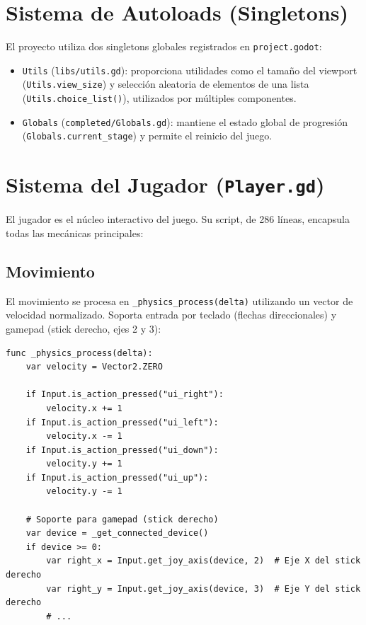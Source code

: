 \documentclass[12pt, a4paper, oneside]{report}
\begin{document}
\section{Sistema de Autoloads (Singletons)}

El proyecto utiliza dos singletons globales registrados en \texttt{project.godot}:

\begin{itemize}
    \item \texttt{Utils} (\texttt{libs/utils.gd}): proporciona utilidades como el tamaño del viewport (\texttt{Utils.view\-\_size}) y selección aleatoria de elementos de una lista (\texttt{Utils.choice\-\_list()}), utilizados por múltiples componentes.
    \item \texttt{Globals} (\texttt{completed/Globals.gd}): mantiene el estado global de progresión (\texttt{Globals.current\-\_stage}) y permite el reinicio del juego.
\end{itemize}



\section{Sistema del Jugador (\texttt{Player.gd})}

El jugador es el núcleo interactivo del juego. Su script, de 286 líneas, encapsula todas las mecánicas principales:

\subsection{Movimiento}
El movimiento se procesa en \texttt{\_physics\_process(delta)} utilizando un vector de velocidad normalizado. Soporta entrada por teclado (flechas direccionales) y gamepad (stick derecho, ejes 2 y 3):

\begin{lstlisting}[style=gdscript, caption=Sistema de movimiento del jugador]
func _physics_process(delta):
    var velocity = Vector2.ZERO
    
    if Input.is_action_pressed("ui_right"):
        velocity.x += 1
    if Input.is_action_pressed("ui_left"):
        velocity.x -= 1
    if Input.is_action_pressed("ui_down"):
        velocity.y += 1
    if Input.is_action_pressed("ui_up"):
        velocity.y -= 1
    
    # Soporte para gamepad (stick derecho)
    var device = _get_connected_device()
    if device >= 0:
        var right_x = Input.get_joy_axis(device, 2)  # Eje X del stick derecho
        var right_y = Input.get_joy_axis(device, 3)  # Eje Y del stick derecho
        # ...
\end{lstlisting}
\end{document}
